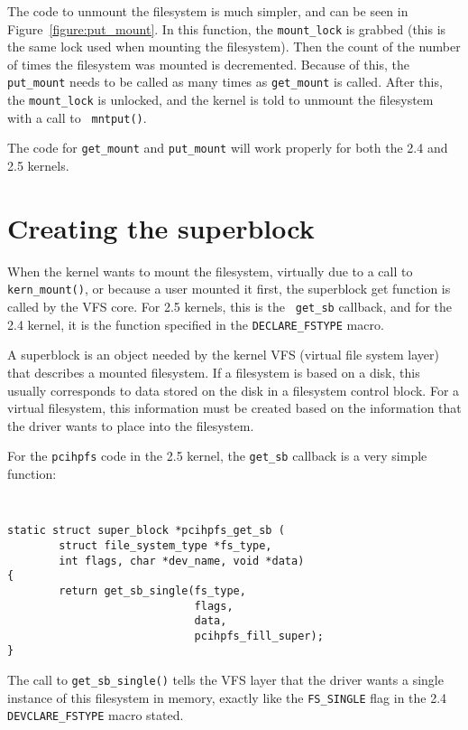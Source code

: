 \documentclass[twocolumn]{article}
\begin{document}
The code to unmount the filesystem is much simpler, and can be seen in
Figure~\ref{figure:put_mount}.  In this function, the {\tt mount\_lock} is
grabbed (this is the same lock used when mounting the filesystem).  Then
the count of the number of times the filesystem was mounted is decremented.
Because of this, the {\tt put\_mount} needs to be called as many times as
{\tt get\_mount} is called.  After this, the {\tt mount\_lock} is unlocked,
and the kernel is told to unmount the filesystem with a call to {\tt
mntput()}.

The code for {\tt get\_mount} and {\tt put\_mount} will work properly for
both the 2.4 and 2.5 kernels.


\section{Creating the superblock}
When the kernel wants to mount the filesystem, virtually due to a call to 
{\tt kern\_mount()}, or because a user mounted it first, the superblock get
function is called by the VFS core.  For 2.5 kernels, this is the {\tt
get\_sb} callback, and for the 2.4 kernel, it is the function specified in
the {\tt DECLARE\_FSTYPE} macro.

A superblock is an object needed by the kernel VFS (virtual file system
layer) that describes a mounted filesystem.  If a filesystem is based on a
disk, this usually corresponds to data stored on the disk in a filesystem
control block.  For a virtual filesystem, this information must be created
based on the information that the driver wants to place into the filesystem.

For the {\tt pcihpfs} code in the 2.5 kernel, the {\tt get\_sb} callback is
a very simple function:
{\tt \small
\begin{verbatim}
static struct super_block *pcihpfs_get_sb (
        struct file_system_type *fs_type,
        int flags, char *dev_name, void *data)
{
        return get_sb_single(fs_type,
                             flags,
                             data,
                             pcihpfs_fill_super);
}
\end{verbatim}
}
The call to {\tt get\_sb\_single()} tells the VFS layer that the driver
wants a single instance of this filesystem in memory, exactly like the 
{\tt FS\_SINGLE} flag in the 2.4 {\tt DEVCLARE\_FSTYPE} macro stated.
\end{document}
